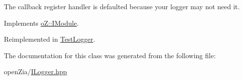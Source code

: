 The callback register handler is defaulted because your logger may not need it. 



Implements \mbox{\hyperlink{classo_z_1_1_i_module_a3dc905faa6df5e22eecc6ffbc923fd95}{o\+Z\+::\+I\+Module}}.



Reimplemented in \mbox{\hyperlink{class_test_logger_a0ee94278a66b189ca55f04e40192b5d1}{Test\+Logger}}.



The documentation for this class was generated from the following file\+:\begin{DoxyCompactItemize}
\item 
open\+Zia/\mbox{\hyperlink{_i_logger_8hpp}{I\+Logger.\+hpp}}\end{DoxyCompactItemize}
